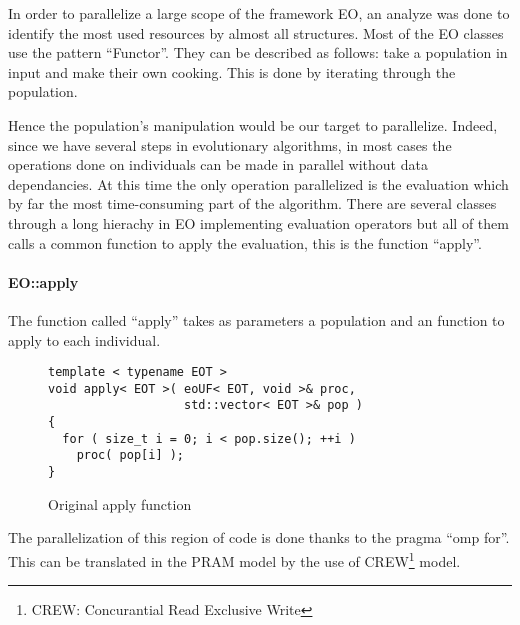 \documentclass{sig-alternate}
\begin{document}
In order to parallelize a large scope of the framework EO, an analyze was done to identify the most used resources by almost all structures. Most of the EO classes use the pattern ``Functor''. They can be described as follows: take a population in input and make their own cooking. This is done by iterating through the population.

Hence the population's manipulation would be our target to parallelize. Indeed, since we have several steps in evolutionary algorithms, in most cases the operations done on individuals can be made in parallel without data dependancies. At this time the only operation parallelized is the evaluation which by far the most time-consuming part of the algorithm. There are several classes through a long hierachy in EO implementing evaluation operators but all of them calls a common function to apply the evaluation, this is the function ``apply''.

\paragraph{EO::apply} %
The function called ``apply'' takes as parameters a population and an function to apply to each individual.


\begin{figure}[here]
\centering
\begin{verbatim}
template < typename EOT >
void apply< EOT >( eoUF< EOT, void >& proc,
                   std::vector< EOT >& pop )
{
  for ( size_t i = 0; i < pop.size(); ++i )
    proc( pop[i] );
}
\end{verbatim}
\caption{Original apply function}
\end{figure}


The parallelization of this region of code is done thanks to the pragma ``omp for''. This can be translated in the PRAM model by the use of CREW\footnote{CREW: Concurantial Read Exclusive Write} model.

\end{document}
